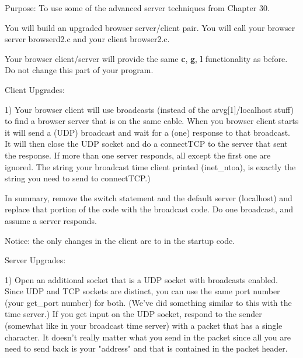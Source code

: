 

\parindent 0pt

Purpose: To use some of the advanced server techniques from
Chapter 30.

You will build an upgraded browser server/client pair.
You will call your browser server {\ltt{}browserd2.c}
and your client {\ltt{}browser2.c}.

Your browser client/server will provide the same {\bf c}, {\bf g},
{\bf l} functionality as before.
Do not change this part of your program.

Client Upgrades:

1) Your browser client will use broadcasts (instead of the
{\ltt{}arvg[1]}/{\ltt{}localhost} stuff) to find a browser
server that is on the same cable.
When you browser client starts it will send a (UDP) broadcast and
wait for a (one) response to that broadcast. It will then close
the UDP socket and do a {\ltt{}connectTCP} to the server that
sent the response. If more than one server responds, all except
the first one are ignored.
The string your broadcast time client printed ({\ltt{}inet_ntoa}),
is exactly the string you need to send to {\ltt{}connectTCP}.)

In summary, remove the switch statement and the default
server ({\ltt{}localhost}) and replace that portion of the code
with the broadcast code.
Do one broadcast, and assume a server responds.

Notice: the only changes in the client are to in the startup code.

Server Upgrades:

1) Open an additional socket that is a UDP socket with broadcasts enabled.
Since UDP and TCP sockets are distinct, you can use the same port number
(your {\ltt{}get_port} number) for both.
(We've did something similar to this with the time server.)
If you get input on the UDP socket, respond to the sender (somewhat like in your
broadcast time server) with a packet that has a single character.
It doesn't really matter what you send in the packet
since all you are need to send back is your "address" and
that is contained in the packet header.


